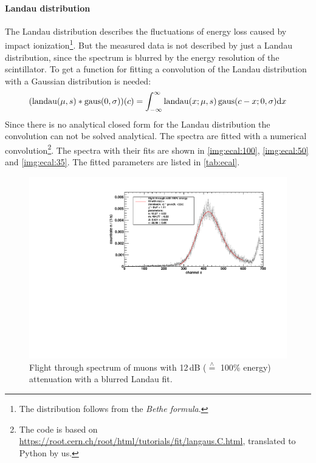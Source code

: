 \paragraph{Landau distribution}
The Landau distribution describes the fluctuations of energy loss caused by impact 
ionization\footnote{The distribution follows from the \emph{Bethe formula}.}.
But the measured data is not described by just a Landau distribution, since the spectrum is blurred by the energy resolution of the scintillator. 
To get a function for fitting a convolution of the Landau distribution with a Gaussian distribution is needed:
\begin{equation}
    \label{eq:landaugausconv}
    (\operatorname{landau}(\mu, s) *  \operatorname{gaus}(0, \sigma))(c) = \int_{-\infty}^{\infty} \operatorname{landau}(x;\mu, s) \operatorname{gaus}(c-x;0,\sigma)\mathrm{d} x
\end{equation}
Since there is no analytical closed form for the Landau distribution the convolution can not be solved analytical. The spectra are fitted with a
numerical convolution\footnote{The code is based on \url{https://root.cern.ch/root/html/tutorials/fit/langaus.C.html}, translated to Python by us.}. 
The spectra with their fits are shown in \autoref{img:ecal:100}, \autoref{img:ecal:50} and \autoref{img:ecal:35}. The fitted parameters are listed in 
\autoref{tab:ecal}.
\begin{figure}[H]
\begin{center}
  \includegraphics[width=\textwidth]{../img/energiekalibration_100.pdf}
  \caption{Flight through spectrum of muons with 12\,dB ($\overset{\wedge}{=}$ 100\% energy) attenuation with a blurred Landau fit.}
  \label{img:ecal:100}
\end{center}
\end{figure}

